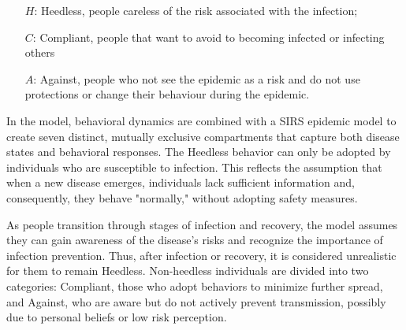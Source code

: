 \begin{itemize}
	\item[$H$:] Heedless, people careless of the risk associated with the infection;
	\item[$C$:] Compliant, people that want to avoid to becoming infected or infecting others
	\item[$A$:] Against, people who not see the epidemic as a risk and do not use protections or change their behaviour during the epidemic. 
\end{itemize}

In the model, behavioral dynamics are combined with a SIRS epidemic model to create seven distinct, mutually exclusive compartments that capture both disease states and behavioral responses. The Heedless behavior can only be adopted by individuals who are susceptible to infection. This reflects the assumption that when a new disease emerges, individuals lack sufficient information and, consequently, they behave "normally," without adopting safety measures.

As people transition through stages of infection and recovery, the model assumes they can gain awareness of the disease's risks and recognize the importance of infection prevention. Thus, after infection or recovery, it is considered unrealistic for them to remain Heedless. Non-heedless individuals are divided into two categories: Compliant, those who adopt behaviors to minimize further spread, and Against, who are aware but do not actively prevent transmission, possibly due to personal beliefs or low risk perception. 

